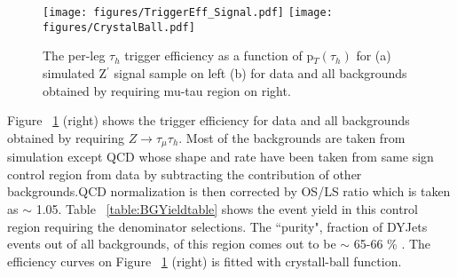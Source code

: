 \begin{figure}[tbh!]
  \centering
    \texttt{[image: figures/TriggerEff\_Signal.pdf]}
    \texttt{[image: figures/CrystalBall.pdf]}
  \caption{The per-leg $\tau_{h}$ trigger efficiency as a function of p$_{T}(\tau_{h})$ for (a) simulated Z$^{\prime}$ signal sample on left (b) for data and all backgrounds obtained by requiring mu-tau region on right.}
  \label{fig:trigger}
\end{figure}

Figure ~\ref{fig:trigger} (right) shows the trigger efficiency for data and all backgrounds obtained by requiring $Z\to\tau_{\mu} \tau_{h}$. Most of the backgrounds are taken from simulation except QCD whose shape and rate have been taken from same sign control region from data by subtracting the contribution of other backgrounds.QCD normalization is  then corrected by OS/LS ratio which is taken as $\sim$ 1.05. Table ~\ref{table:BGYieldtable} shows the event yield in this control region requiring the denominator selections. The ``purity", fraction of DYJets events out of all backgrounds, of this region comes out to be $\sim$ 65-66 \% . The efficiency curves on Figure ~\ref{fig:trigger} (right) is fitted with crystall-ball function.

\begin{table}[!htpb]
   \caption{Event rate in mu-tau control region after requiring denominator level selections }
   \label{table:BGYieldtable} %
 \end{table}
